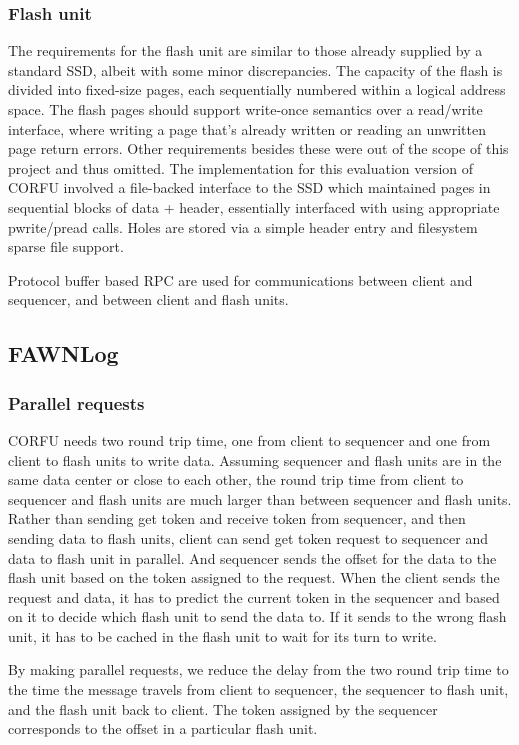 \documentclass[letterpaper,twocolumn,10pt]{article}
\begin{document}
\subsubsection{Flash unit}
The requirements for the flash unit are similar to those already supplied by a standard SSD, albeit with some minor discrepancies. The capacity of the flash is divided into fixed-size pages, each sequentially numbered within a logical address space. The flash pages should support write-once semantics over a read/write interface, where writing a page that’s already written or reading an unwritten page return errors. Other requirements besides these were out of the scope of this project and thus omitted. The implementation for this evaluation version of CORFU involved a file-backed interface to the SSD which maintained pages in sequential blocks of data + header, essentially interfaced with using appropriate pwrite/pread calls. Holes are stored via a simple header entry and filesystem sparse file support.

Protocol buffer based RPC are used for communications between client and sequencer, and between client and flash units.

\subsection{FAWNLog}
\subsubsection{Parallel requests}
CORFU needs two round trip time, one from client to sequencer and one from client to flash units to write data. Assuming sequencer and flash units are in the same data center or close to each other, the round trip time from client to sequencer and flash units are much larger than between sequencer and flash units. Rather than sending get token and receive token from sequencer, and then sending data to flash units, client can send get token request to sequencer and data to flash unit in parallel. And sequencer sends the offset for the data to the flash unit based on the token assigned to the request. When the client sends the request and data, it has to predict the current token in the sequencer and based on it to decide which flash unit to send the data to. If it sends to the wrong flash unit, it has to be cached in the flash unit to wait for its turn to write.

By making parallel requests, we reduce the delay from the two round trip time to the time the message travels from client to sequencer, the sequencer to flash unit, and the flash unit back to client. The token assigned by the sequencer corresponds to the offset in a particular flash unit. 
\end{document}
